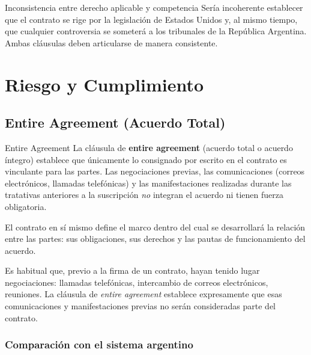 \documentclass[12pt,oneside]{book}
\begin{document}
\begin{example}{Inconsistencia entre derecho aplicable y competencia}
Sería incoherente establecer que el contrato se rige por la legislación de
Estados Unidos y, al mismo tiempo, que cualquier controversia se someterá
a los tribunales de la República Argentina. Ambas cláusulas deben
articularse de manera consistente.
\end{example}

\chapter{Riesgo y Cumplimiento}

\section{Entire Agreement (Acuerdo Total)}

\begin{definition}{Entire Agreement}
La cláusula de \textbf{entire agreement} (acuerdo total o acuerdo
íntegro) establece que únicamente lo consignado por escrito en el
contrato es vinculante para las partes. Las negociaciones previas,
las comunicaciones (correos electrónicos, llamadas telefónicas) y las
manifestaciones realizadas durante las tratativas anteriores a la
suscripción \emph{no} integran el acuerdo ni tienen fuerza obligatoria.
\end{definition}

El contrato en sí mismo define el marco dentro del cual se desarrollará
la relación entre las partes: sus obligaciones, sus derechos y las pautas
de funcionamiento del acuerdo.

\begin{note}
Es habitual que, previo a la firma de un contrato, hayan tenido lugar
negociaciones: llamadas telefónicas, intercambio de correos electrónicos,
reuniones. La cláusula de \textit{entire agreement} establece
expresamente que esas comunicaciones y manifestaciones previas no serán
consideradas parte del contrato.
\end{note}

\subsection{Comparación con el sistema argentino}
\end{document}
